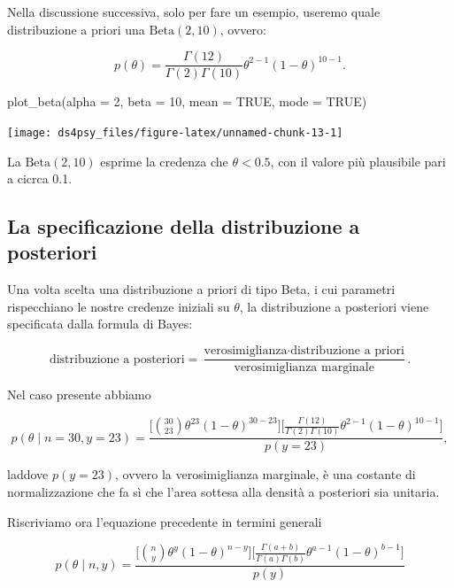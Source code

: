 \documentclass[
  11pt,
]{krantz}
\makeatletter
\newenvironment{Shaded}{\begin{snugshade}}{\end{snugshade}}
\newcommand{\AttributeTok}[1]{\textcolor[rgb]{0.61,0.61,0.61}{#1}}
\newcommand{\ConstantTok}[1]{\textcolor[rgb]{0,0,0}{#1}}
\newcommand{\DecValTok}[1]{\textcolor[rgb]{0.06,0.06,0.06}{#1}}
\newcommand{\FunctionTok}[1]{\textcolor[rgb]{0,0,0}{#1}}
\newcommand{\NormalTok}[1]{#1}
\newenvironment{kframe}{%
\medskip{}
\setlength{\fboxsep}{.8em}
 \def\at@end@of@kframe{}%
 \ifinner\ifhmode%
  \def\at@end@of@kframe{\end{minipage}}%
  \begin{minipage}{\columnwidth}%
 \fi\fi%
 \def\FrameCommand##1{\hskip\@totalleftmargin \hskip-\fboxsep
 \colorbox{shadecolor}{##1}\hskip-\fboxsep
     \hskip-\linewidth \hskip-\@totalleftmargin \hskip\columnwidth}%
 \MakeFramed {\advance\hsize-\width
   \@totalleftmargin\z@ \linewidth\hsize
   \@setminipage}}%
 {\par\unskip\endMakeFramed%
 \at@end@of@kframe}
\renewenvironment{Shaded}{\begin{kframe}}{\end{kframe}}
\theoremstyle{definition}
\theoremstyle{definition}
\theoremstyle{definition}
\theoremstyle{definition}
\theoremstyle{remark}
\makeatother
\begin{document}
Nella discussione successiva, solo per fare un esempio, useremo quale distribuzione a priori una \(\mbox{Beta}(2, 10)\), ovvero:

\[
p(\theta) = \frac{\Gamma(12)}{\Gamma(2)\Gamma(10)}\theta^{2-1} (1-\theta)^{10-1}.
\]

\begin{Shaded}
\begin{Highlighting}[]
\FunctionTok{plot\_beta}\NormalTok{(}\AttributeTok{alpha =} \DecValTok{2}\NormalTok{, }\AttributeTok{beta =} \DecValTok{10}\NormalTok{, }\AttributeTok{mean =} \ConstantTok{TRUE}\NormalTok{, }\AttributeTok{mode =} \ConstantTok{TRUE}\NormalTok{)}
\end{Highlighting}
\end{Shaded}

\begin{center}\texttt{[image: ds4psy\_files/figure-latex/unnamed-chunk-13-1]} \end{center}

La \(\mbox{Beta}(2, 10)\) esprime la credenza che \(\theta < 0.5\), con il valore più plausibile pari a cicrca 0.1.

\hypertarget{la-specificazione-della-distribuzione-a-posteriori}{%
\subsection{La specificazione della distribuzione a posteriori}\label{la-specificazione-della-distribuzione-a-posteriori}}

Una volta scelta una distribuzione a priori di tipo Beta, i cui parametri rispecchiano le nostre credenze iniziali su \(\theta\), la distribuzione a posteriori viene specificata dalla formula di Bayes:

\[
\text{distribuzione a posteriori} = \frac{\text{verosimiglianza}\cdot\text{distribuzione a priori}}{\text{verosimiglianza marginale}}.
\]

Nel caso presente abbiamo

\[
p(\theta \mid n=30, y=23) = \frac{\Big[\binom{30}{23}\theta^{23}(1-\theta)^{30-23}\Big]\Big[\frac{\Gamma(12)}{\Gamma(2)\Gamma(10)}\theta^{2-1} (1-\theta)^{10-1}\Big]}{p(y = 23)},
\]

laddove \(p(y = 23)\), ovvero la verosimiglianza marginale, è una costante di normalizzazione che fa sì che l'area sottesa alla densità a posteriori sia unitaria.

Riscriviamo ora l'equazione precedente in termini generali

\[
p(\theta \mid n, y) = \frac{\Big[\binom{n}{y}\theta^{y}(1-\theta)^{n-y}\Big]\Big[\frac{\Gamma(a+b)}{\Gamma(a)\Gamma(b)}\theta^{a-1} (1-\theta)^{b-1}\Big]}{p(y)}
\]
\end{document}
